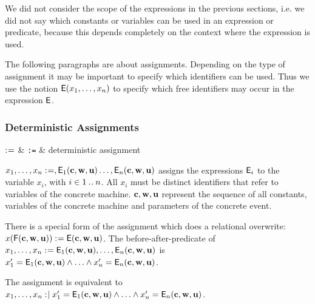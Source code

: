 We did not consider the scope of the expressions in the previous sections, i.e. we did not say which constants or variables can be used in an expression or predicate, because
this depends completely on the context where the expression is used.

The following paragraphs are about assignments. Depending on the type of assignment it
may be important to specify which identifiers can be used.
Thus we use the notion $\textsf{E}(x_1,\ldots,x_n)$ to specify which free identifiers may occur
in the expression $\textsf{E}$.

\newcommand{\eventbassignmentexpr}[1]{\expre_{#1}(\allconstants,\concvariables,\concparameters)}

\begin{samepage}
\subsubsection{Deterministic Assignments}
\label{deterministic_assignments}
\begin{rrnames}
  $\mathrel{:\mkern1mu=}$ & \texttt{:=} & deterministic assignment
\end{rrnames}
\begin{rodinrefentry}
  \rrdesc
    $x_1,\ldots,x_n \bcmeq ,\eventbassignmentexpr{1}\ldots,\eventbassignmentexpr{n}$
    assigns the expressions $\textsf{E}_i$ to the variable $x_i$, with $i\in1\mathbin{.\mkern1mu.} n$.
    All $x_i$ must be distinct identifiers that refer to variables of the concrete machine.
    $\mathbf{c},\mathbf{w},\mathbf{u}$ represent the sequence of all constants, 
    variables of the concrete machine and parameters of the concrete event.

    There is a special form of the assignment which does a relational overwrite:\\
    $x(\textsf{F}(\mathbf{c},\mathbf{w},\mathbf{u})) \mathrel{:\mkern1mu=} \textsf{E}(\mathbf{c},\mathbf{w},\mathbf{u})$.
  \rrdef
    The before-after-predicate of $x_1,\ldots,x_n \bcmeq \eventbassignmentexpr{1},\ldots,\eventbassignmentexpr{n}$ is\\ $x_1' = \eventbassignmentexpr{1} \land \ldots \land x_n' = \eventbassignmentexpr{n}$.

    The assignment is equivalent to
    $x_1,\ldots,x_n \bcmsuch x_1' = \eventbassignmentexpr{1} \land \ldots \land x_n' = \eventbassignmentexpr{n}$.


\end{rodinrefentry}
\end{samepage}
